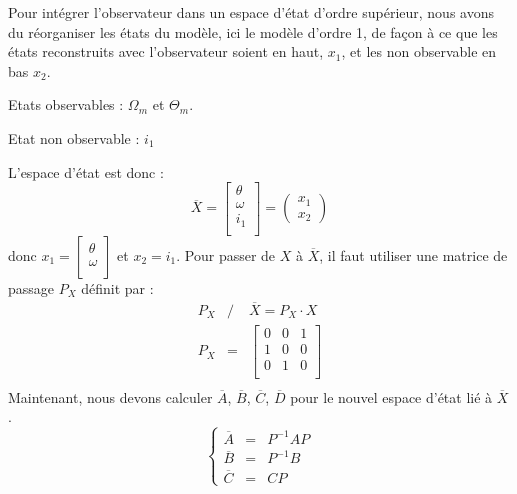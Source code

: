Pour intégrer l'observateur dans un espace d'état d'ordre supérieur, nous avons du réorganiser les états du modèle, ici le modèle d'ordre 1, de façon à ce que les états reconstruits avec l'observateur soient en haut, $x_1$, et les non observable en bas $x_2$.

\noindent\textbullet\hspace{2mm} Etats observables : $\Omega_m$ et $ \Theta_m$.

\noindent\textbullet\hspace{2mm} Etat non observable : $i_1$

\noindent\textbullet\hspace{2mm} L'espace d'état est donc : 
\begin{equation}
\overline{X} = \begin{bmatrix}
\theta\\
\omega\\
i_1\\
\end{bmatrix} = \begin{pmatrix}
x_1\\x_2
\end{pmatrix}
\end{equation}
donc $x_1 = \begin{bmatrix}
\theta\\
\omega\\ \end{bmatrix}$ et $x_2 = i_1$. Pour passer de $X$ à $\overline{X}$, il faut utiliser une matrice de passage $P_X$ définit par :
 \begin{eqnarray}
 P_X &/&  \overline{X} =P_X \cdot X \\
 P_X &=&\begin{bmatrix}
 0 & 0 & 1 \\
 1 & 0 & 0 \\
 0 & 1 & 0 \\
\end{bmatrix}  \\
 \end{eqnarray}
Maintenant, nous devons calculer $\overline{A}$, $\overline{B}$, $\overline{C}$, $\overline{D}$ pour le nouvel espace d'état lié à $\overline{X}$.
\begin{equation}%
	\left\lbrace%
	\begin{matrix}
		\overline{A} &=& P^{-1} A P \\%
		\overline{B} &=& P^{-1} B \\%
		\overline{C} &=& C P%
	\end{matrix}
\right.%
\end{equation}


